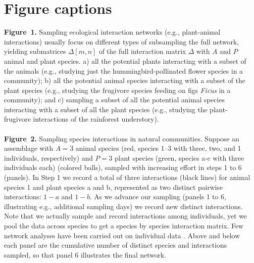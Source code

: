 \documentclass[12pt]{article}
\begin{document}
\section*{Figure captions}
\noindent \textbf{Figure~1.} Sampling ecological interaction networks (e.g., plant-animal interactions) usually focus on different types of subsampling the full network, yielding submatrices $\Delta[m,n]$ of the full interaction matrix $\Delta$ with $A$ and $P$ animal and plant species. a) all the potential plants interacting with a subset of the animals (e.g., studying just the hummingbird-pollinated flower species in a community); b) all the potential animal species interacting with a subset of the plant species (e.g., studying the frugivore species feeding on figs \emph{Ficus} in a community); and c) sampling a subset of all the potential animal species interacting with a subset of all the plant species (e.g., studying the plant-frugivore interactions of the rainforest understory). \\\\
\noindent \textbf{Figure~2.} Sampling species interactions in natural communities. Suppose an assemblage with $A= 3$ animal species (red, species 1--3 with three, two, and 1 individuals, respectively) and $P= 3$ plant species (green, species a-c with three individuals each) (colored balls), sampled with increasing effort in steps 1 to 6 (panels). In Step 1 we record a total of three interactions (black lines) for animal species 1 and plant species a and b, represented as two distinct pairwise interactions: $1-a$ and $1-b$. As we advance our sampling (panels 1 to 6, illustrating e.g., additional sampling days) we record new distinct interactions. Note that we actually sample and record interactions among individuals, yet we pool the data across species to get a species by species interaction matrix. Few network analyses have been carried out on individual data \citep[e.g.,][]{Dupont:2014ex}. Above and below each panel are the cumulative number of distinct species and interactions sampled, so that panel 6 illustrates the final network. \\
\newpage
\end{document}
